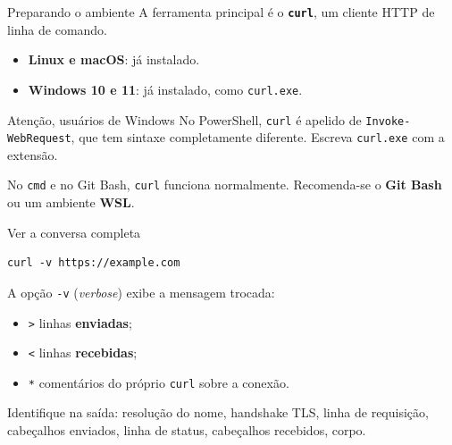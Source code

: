 \documentclass{beamer}
\begin{document}
\begin{frame}{Preparando o ambiente}
  A ferramenta principal é o \textbf{\texttt{curl}}, um cliente HTTP de linha de
  comando.

  \begin{itemize}
    \item \textbf{Linux e macOS}: já instalado.
    \item \textbf{Windows 10 e 11}: já instalado, como \texttt{curl.exe}.
  \end{itemize}

  \vspace{0.4cm}
  \begin{alertblock}{Atenção, usuários de Windows}
    No PowerShell, \texttt{curl} é apelido de \texttt{Invoke-WebRequest}, que
    tem sintaxe completamente diferente. Escreva \texttt{curl.exe} com a
    extensão.

    \vspace{0.2cm}
    No \texttt{cmd} e no Git Bash, \texttt{curl} funciona normalmente.
    Recomenda-se o \textbf{Git Bash} ou um ambiente \textbf{WSL}.
  \end{alertblock}
\end{frame}

\begin{frame}[fragile]{Ver a conversa completa}
  \begin{verbatim}
curl -v https://example.com
  \end{verbatim}

  A opção \texttt{-v} (\textit{verbose}) exibe a mensagem trocada:

  \begin{itemize}
    \item \texttt{>} linhas \textbf{enviadas};
    \item \texttt{<} linhas \textbf{recebidas};
    \item \texttt{*} comentários do próprio \texttt{curl} sobre a conexão.
  \end{itemize}

  \vspace{0.3cm}
  Identifique na saída: resolução do nome, handshake TLS, linha de requisição,
  cabeçalhos enviados, linha de status, cabeçalhos recebidos, corpo.
\end{frame}
\end{document}
